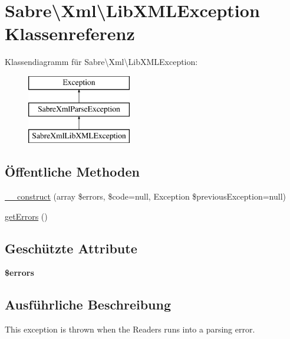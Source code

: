 \hypertarget{class_sabre_1_1_xml_1_1_lib_x_m_l_exception}{}\section{Sabre\textbackslash{}Xml\textbackslash{}Lib\+X\+M\+L\+Exception Klassenreferenz}
\label{class_sabre_1_1_xml_1_1_lib_x_m_l_exception}
Klassendiagramm für Sabre\textbackslash{}Xml\textbackslash{}Lib\+X\+M\+L\+Exception\+:\begin{figure}[H]
\begin{center}
\leavevmode
\includegraphics[height=3.000000cm]{class_sabre_1_1_xml_1_1_lib_x_m_l_exception}
\end{center}
\end{figure}
\subsection*{Öffentliche Methoden}
\begin{DoxyCompactItemize}
\item 
\mbox{\hyperlink{class_sabre_1_1_xml_1_1_lib_x_m_l_exception_a8a292b477d89d401516b3aae638ad55d}{\+\_\+\+\_\+construct}} (array \$errors, \$code=null, Exception \$previous\+Exception=null)
\item 
\mbox{\hyperlink{class_sabre_1_1_xml_1_1_lib_x_m_l_exception_a1e687a71bf8968fc88ab75f919d6d0c9}{get\+Errors}} ()
\end{DoxyCompactItemize}
\subsection*{Geschützte Attribute}
\begin{DoxyCompactItemize}
\item 
\mbox{\label{class_sabre_1_1_xml_1_1_lib_x_m_l_exception_a65cf9179ec4e4b855c2dd83003d98c08}} 
{\bfseries \$errors}
\end{DoxyCompactItemize}


\subsection{Ausführliche Beschreibung}
This exception is thrown when the Readers runs into a parsing error.

